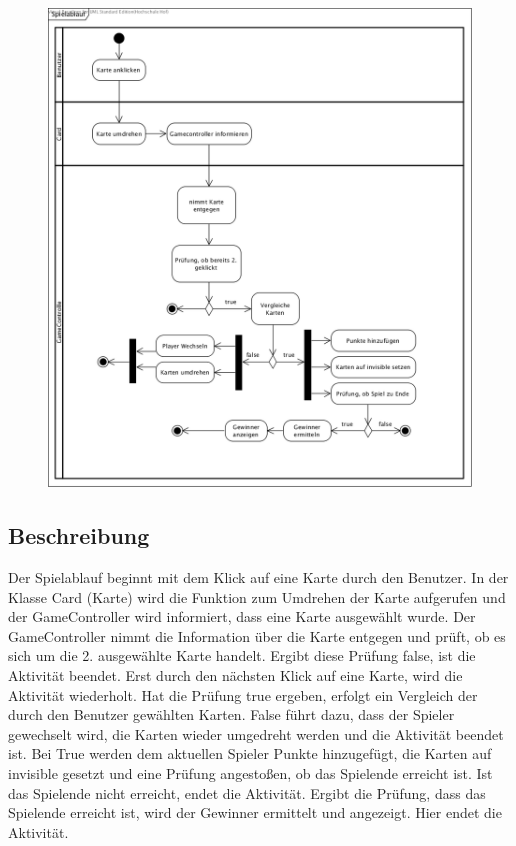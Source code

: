 \begin{figure}[!h]
	\centering
    \includegraphics[width=\textwidth]{./AD_Spielablauf.png}
	\label{layout_gesamt}
\end{figure}
\subsection{Beschreibung}
Der Spielablauf beginnt mit dem Klick auf eine Karte durch den Benutzer. In der Klasse Card (Karte) wird die Funktion zum Umdrehen der Karte aufgerufen und der GameController wird informiert, dass eine Karte ausgewählt wurde. Der GameController nimmt die Information über die Karte entgegen und prüft, ob es sich um die 2. ausgewählte Karte handelt. Ergibt diese Prüfung false, ist die Aktivität beendet. Erst durch den nächsten Klick auf eine Karte, wird die Aktivität wiederholt. Hat die Prüfung true ergeben, erfolgt ein Vergleich der durch den Benutzer gewählten Karten. False führt dazu, dass der Spieler gewechselt wird, die Karten wieder umgedreht werden und die Aktivität beendet ist. Bei True werden dem aktuellen Spieler Punkte hinzugefügt, die Karten auf invisible gesetzt und eine Prüfung angestoßen, ob das Spielende erreicht ist. Ist das Spielende nicht erreicht, endet die Aktivität. Ergibt die Prüfung, dass das Spielende erreicht ist, wird der Gewinner ermittelt und angezeigt. Hier endet die Aktivität.


